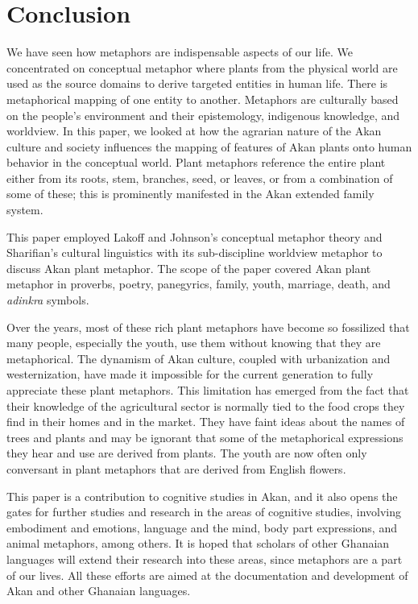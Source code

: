 \documentclass[output=paper,colorlinks,citecolor=brown]{langscibook}
\begin{document}
\section{Conclusion} \label{07_Conclusion}

We have seen how metaphors are indispensable aspects of our life. We concentrated on conceptual metaphor where plants from the physical world are used as the source domains to derive targeted entities in human life. There is metaphorical mapping of one entity to another. Metaphors are culturally based on the people’s environment and their epistemology, indigenous knowledge, and worldview. In this paper, we looked at how the agrarian nature of the Akan culture and society influences the mapping of features of Akan plants onto human behavior in the conceptual world. Plant metaphors reference the entire plant either from its roots, stem, branches, seed, or leaves, or from a combination of some of these; this is prominently manifested in the Akan extended family system.

This paper employed Lakoff and Johnson's conceptual metaphor theory and Sharifian’s cultural linguistics with its sub-discipline worldview metaphor to discuss Akan plant metaphor. The scope of the paper covered Akan plant metaphor in proverbs, poetry, panegyrics, family, youth, marriage, death, and \textit{adinkra} symbols. 

Over the years, most of these rich plant metaphors have become so fossilized that many people, especially the youth, use them without knowing that they are metaphorical. The dynamism of Akan culture, coupled with urbanization and westernization, have made it impossible for the current generation to fully appreciate these plant metaphors. This limitation has emerged from the fact that their knowledge of the agricultural sector is normally tied to the food crops they find in their homes and in the market. They have faint ideas about the names of trees and plants and may be ignorant that some of the metaphorical expressions they hear and use are derived from plants. The youth are now often only conversant in plant metaphors that are derived from English flowers. 

This paper is a contribution to cognitive studies in Akan, and it also opens the gates for further studies and research in the areas of cognitive studies, involving embodiment and emotions, language and the mind, body part expressions, and animal metaphors, among others. It is hoped that scholars of other Ghanaian languages will extend their research into these areas, since metaphors are a part of our lives. All these efforts are aimed at the documentation and development of Akan and other Ghanaian languages.
 
\end{document}
